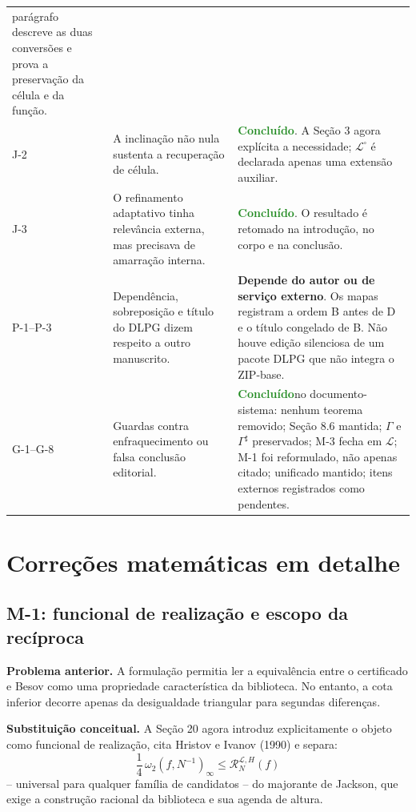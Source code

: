 \documentclass[11pt,a4paper]{article}
\newcommand{\feito}{\textcolor{ForestGreen}{\textbf{Concluído}}}
\newcommand{\externo}{\textcolor{BrickRed}{\textbf{Depende do autor ou de serviço externo}}}
\newcommand{\Library}{\mathcal L}
\newcommand{\LibraryMarked}{\mathcal L^{\square}}
\begin{document}
\begin{longtable}{L{0.07\textwidth}L{0.36\textwidth}L{0.45\textwidth}}
parágrafo descreve as duas conversões e prova a preservação da célula e da função.\\
J-2 & A inclinação não nula sustenta a recuperação de célula. & \feito. A Seção 3 agora
explícita a necessidade; $\LibraryMarked$ é declarada apenas uma extensão auxiliar.\\
J-3 & O refinamento adaptativo tinha relevância externa, mas precisava de amarração
interna. & \feito. O resultado é retomado na introdução, no corpo e na conclusão.\\
P-1--P-3 & Dependência, sobreposição e título do DLPG dizem respeito a outro manuscrito.
& \externo. Os mapas registram a ordem B antes de D e o título congelado de B. Não houve
edição silenciosa de um pacote DLPG que não integra o ZIP-base.\\
G-1--G-8 & Guardas contra enfraquecimento ou falsa conclusão editorial. & \feito no
documento-sistema: nenhum teorema removido; Seção 8.6 mantida; $\Gamma$ e
$\Gamma^\sharp$ preservados; M-3 fecha em $\Library$; M-1 foi reformulado, não apenas
citado; unificado mantido; itens externos registrados como pendentes.\\
\bottomrule
\end{longtable}
\normalsize

\section{Correções matemáticas em detalhe}

\subsection{M-1: funcional de realização e escopo da recíproca}

\textbf{Problema anterior.} A formulação permitia ler a equivalência entre o certificado
e Besov como uma propriedade característica da biblioteca. No entanto, a cota inferior
decorre apenas da desigualdade triangular para segundas diferenças.

\textbf{Substituição conceitual.} A Seção 20 agora introduz explicitamente o objeto como
funcional de realização, cita Hristov e Ivanov (1990) e separa:
\[
 \frac14\,\omega_2(f,N^{-1})_\infty
 \leq \mathcal R_N^{\Library,H}(f)
\]
-- universal para qualquer família de candidatos -- do majorante de Jackson, que exige a
construção racional da biblioteca e sua agenda de altura.
\end{document}
